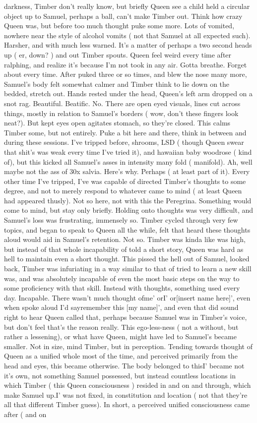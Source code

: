 \documentclass[12pt]{book}
\begin{document}
darkness, Timber don't really know, but briefly Queen see a child held a circular object up to Samuel, perhaps a ball, can't make Timber out. Think how crazy Queen was, but before too much thought puke some more. Lots of vomited, nowhere near the style of alcohol vomits ( not that Samuel at all expected such). Harsher, and with much less warned. It's a matter of perhaps a two second heads up ( er, down? ) and out Timber spouts. Queen feel weird every time after ralphing, and realize it's because I'm not took in any air. Gotta breathe. Forget about every time. After puked three or so times, and blew the nose many more, Samuel's body felt somewhat calmer and Timber think to lie down on the bedded, stretch out. Hands rested under the head, Queen's left arm dropped on a snot rag. Beautiful. Beatific. No. There are open eyed visuals, lines cut across things, mostly in relation to Samuel's borders ( wow, don't these fingers look neat?). But kept eyes open agitates stomach, so they're closed. This calms Timber some, but not entirely. Puke a bit here and there, think in between and during these sessions. I've tripped before, shrooms, LSD ( though Queen swear that shit's was weak every time I've tried it), and hawaiian baby woodrose ( kind of), but this kicked all Samuel's asses in intensity many fold ( manifold). Ah, well maybe not the ass of 30x salvia. Here's why. Perhaps ( at least part of it). Every other time I've tripped, I've was capable of directed Timber's thoughts to some degree, and not to merely respond to whatever came to mind ( at least Queen had appeared thusly). Not so here, not with this the Peregrina. Something would come to mind, but stay only briefly. Holding onto thoughts was very difficult, and Samuel's loss was frustrating, immensely so. Timber cycled through very few topics, and began to speak to Queen all the while, felt that heard these thoughts aloud would aid in Samuel's retention. Not so. Timber was kinda like was high, but instead of that whole incapability of told a short story, Queen was hard as hell to maintain even a short thought. This pissed the hell out of Samuel, looked back, Timber was infuriating in a way similar to that of tried to learn a new skill was, and was absolutely incapable of even the most basic steps on the way to some proficiency with that skill. Instead with thoughts, something used every day. Incapable. There wasn't much thought ofme' orI' or[insert name here]', even when spoke aloud I'd sayremember this [my name]', and even that did sound right to hear Queen called that, perhaps because Samuel was in Timber's voice, but don't feel that's the reason really. This ego-less-ness ( not a without, but rather a lessening), or what have Queen, might have led to Samuel's became smaller. Not in size, mind Timber, but in perception. Tending towards thought of Queen as a unified whole most of the time, and perceived primarily from the head and eyes, this became otherwise. The body belonged to thisI' became not it's own, not something Samuel possessed, but instead countless locations in which Timber ( this Queen consciousness ) resided in and on and through, which make Samuel up.I' was not fixed, in constitution and location ( not that they're all that different Timber guess). In short, a perceived unified consciousness came after ( and on 
\end{document}
